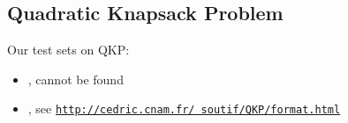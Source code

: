 \documentclass[../main]{subfiles}
\begin{document}
\subsection{Quadratic Knapsack Problem}

Our test sets on QKP:

\begin{itemize}
    \item \cite{johnson_min-cut_1993}, cannot be found
    \item \cite{billionnet_using_2004}, see \texttt{\underline{http://cedric.cnam.fr/~soutif/QKP/format.html}}
\end{itemize}
\end{document}
